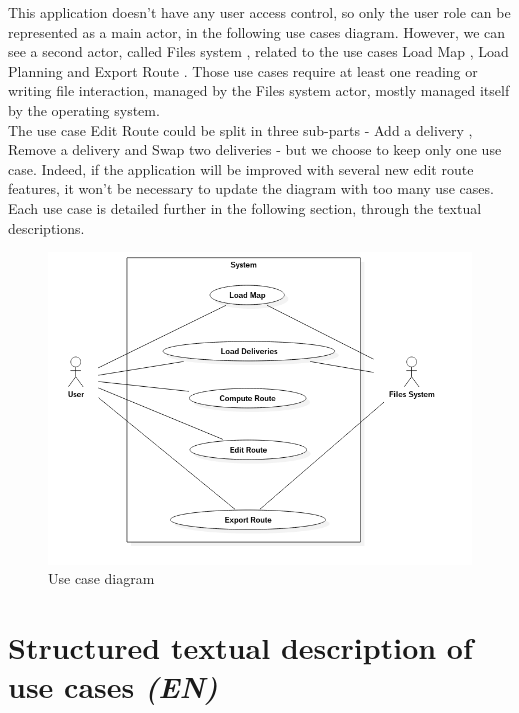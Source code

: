 \documentclass[paper=a4, fontsize=11pt]{report}
\numberwithin{equation}{section}		%
\numberwithin{figure}{section}		%
\numberwithin{table}{section}		%
\renewcommand{\it}[1]{\textit{#1}}
\begin{document}
This application doesn’t have any user access control, so only the user role can be represented as a main actor, in the following use cases diagram. However, we can see a second actor, called \og Files system \fg{}, related to the use cases \og Load Map \fg{}, \og Load Planning \fg{} and \og Export Route \fg{}. Those use cases require at least one reading or writing file interaction, managed by the \og Files system \fg{} actor, mostly managed itself by the operating system.\\

The use case \og Edit Route \fg{} could be split in three sub-parts - \og Add a delivery \fg{}, \og Remove a delivery \fg{} and \og Swap two deliveries \fg{} - but we choose to keep only one use case. Indeed, if the application will be improved with several new edit route features, it won’t be necessary to update the diagram with too many use cases.\\

Each use case is detailed further in the following section, through the textual descriptions.

\begin{figure}[H]
\centering
\includegraphics[scale=0.5,angle=0]{figures/use-case.png}
\caption{Use case diagram}
\end{figure}

\section{Structured textual description of use cases \it{(EN)}}
\label{sec:structured-textual-description-of-use-cases}
\end{document}
